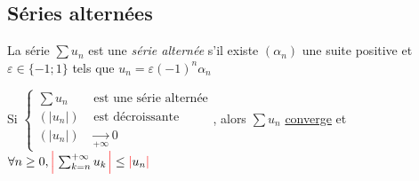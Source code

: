 \documentclass[11pt,a4paper,fleqn,pdftex]{report}
\begin{document}
\subsection{Séries alternées} %
\label{sub:series_alternees}
\begin{dfn}
    La série $\sum u_n$ est une \emph{série alternée} s'il existe $(\alpha_n)$ une suite positive et $\varepsilon \in \lbrace -1 ; 1 \rbrace$ tels que $u_n = \varepsilon (-1)^n\alpha_n$
\end{dfn}
\begin{itheorem}
    Si $\left\lbrace \begin{aligned} \sum u_n &\text{ est une série alternée}\\ (|u_n|) &\text{ est décroissante} \\ (|u_n|) &\xrightarrow[+\infty]{} 0 \end{aligned}\right.$, alors $\sum u_n$ \uline{converge} et $\forall n \ge 0, \textcolor{couleurImp}{\left| \vphantom{\sum_{k=n}^{+\infty}} \right. } \sum_{k=n}^{+\infty}u_k \textcolor{couleurImp}{\left. \vphantom{\sum_{k=n}^{+\infty}} \right| } \le \textcolor{couleurImp}{|} u_n\textcolor{couleurImp}{|}$
\end{itheorem}
\end{document}
